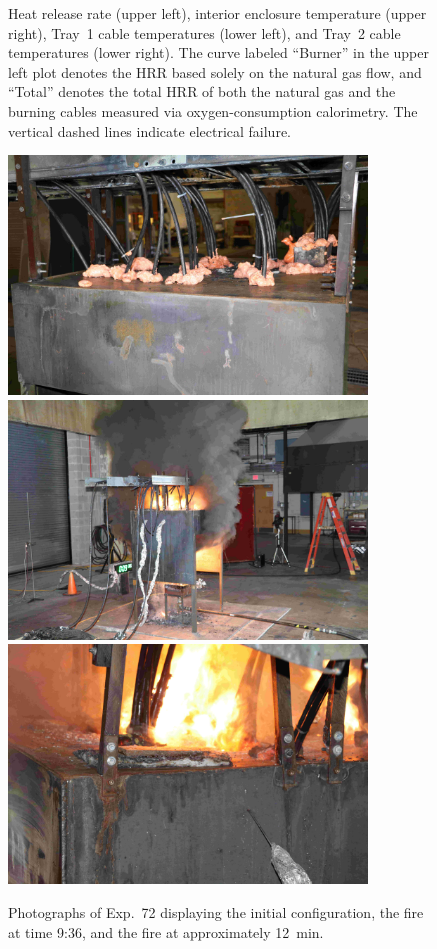 \begin{figure}[H]
\caption[HRR and temperatures of Exp.~72]{Heat release rate (upper left), interior enclosure temperature (upper right), Tray~1 cable temperatures (lower left), and Tray~2 cable temperatures (lower right). The curve labeled ``Burner'' in the upper left plot denotes the HRR based solely on the natural gas flow, and ``Total'' denotes the total HRR of both the natural gas and the burning cables measured via oxygen-consumption calorimetry. The vertical dashed lines indicate electrical failure.}
\label{fig:Test_72}
\end{figure}

\begin{figure}[p]
\centering
\includegraphics[height=2.50in]{../FIGURES/Test_72_Photo_1} \\ \vspace{0.1in}
\includegraphics[height=2.50in]{../FIGURES/Test_72_Photo_2} \\ \vspace{0.1in}
\includegraphics[height=2.50in]{../FIGURES/Test_72_Photo_3}
\caption[Photographs of Exp.~72]{Photographs of Exp.~72 displaying the initial configuration, the fire at time 9:36, and the fire at approximately 12~min.}
\label{fig:Test_72_photos}
\end{figure}


